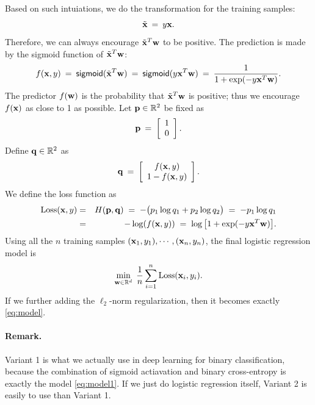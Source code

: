 \documentclass[11pt]{article}
\numberwithin{equation}{section}
\def\pp{{\bf p}}
\def\q{{\bf q}}
\def\w{{\bf w}}
\def\x{{\bf x}}
\def\RB{{\mathbb R}}
\def\sigmoid{\mathsf{sigmoid}}
\begin{document}
Based on such intuiations, 
we do the transformation for the training samples:
\begin{equation*}
\tilde{\x} \: = \: y \x .
\end{equation*}
Therefore, we can always encourage  $\tilde{\x}^T \w$ to be positive.
The prediction is made by the sigmoid function of $\tilde{\x}^T \w$:
\begin{equation*}
f (\x, y)
\: = \:
\sigmoid ( \tilde{\x}^T \w ) 
\: = \:
\sigmoid ( y {\x}^T \w ) 
\: = \: \frac{1}{ 1 + \exp (-y \x^T \w ) } .
\end{equation*}
The predictor $f(\w)$ is the probability that $\tilde{\x}^T \w$ is positive;
thus we encourage $f(\x)$ as close to 1 as possible.
Let $\pp \in \RB^{2}$ be fixed as
\begin{equation*}
\pp \: = \: 
\left[
\begin{array}{c}
1 \\
0 \\
\end{array}
\right].
\end{equation*}
Define $\q \in \RB^2$ as
\begin{equation*}
\q \: = \: 
\left[
\begin{array}{c}
f (\x, y) \\
1 - f (\x, y) \\
\end{array}
\right] .
\end{equation*}
We define the loss function as
\begin{eqnarray*}
	\textrm{Loss} (\x, y)
	& = & H (\pp , \q )
	\; = \; - \big( p_1 \log q_1 + p_2 \log q_2 \big) 
	\; = \; - p_1 \log q_1 \\
	& = & - \log (f(\x, y)) 
	\; = \; \log \big[ 1 + \exp ( - y \x^T \w ) \big].
\end{eqnarray*}
Using all the $n$ training samples $(\x_1, y_1), \cdots , (\x_n, y_n)$, the final logistic regression model is
\begin{equation*}
\min_{\w \in \RB^d} \; \frac{1}{n} \sum_{i=1}^{n} \textrm{Loss} (\x_i, y_i ) .
\end{equation*}
If we further adding the $\ell_2$-norm regularization, then it becomes exactly \eqref{eq:model}.


\paragraph{Remark.}
Variant 1 is what we actually use in deep learning for binary classification, because the combination of sigmoid actiavation and binary cross-entropy is exactly the model \eqref{eq:model1}.
If we just do logistic regression itself, Variant 2 is easily to use than Variant 1.
\end{document}
